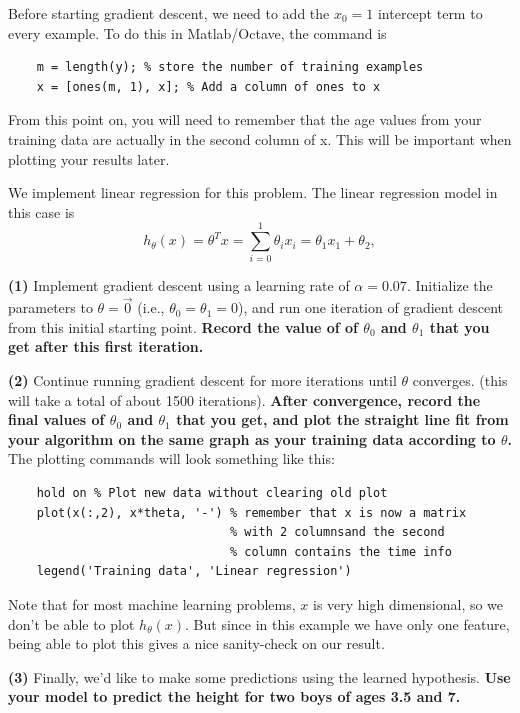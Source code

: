 \documentclass[10pt,a4paper]{article}
\begin{document}
  Before starting gradient descent, we need to add the $x_0 = 1$ intercept term to every example. To do this in Matlab/Octave, the command is
  \begin{lstlisting}
    m = length(y); % store the number of training examples
    x = [ones(m, 1), x]; % Add a column of ones to x
  \end{lstlisting}
  From this point on, you will need to remember that the age values from your training data are actually in the second column of x. This will be important when plotting your results later.


  We implement linear regression for this problem. The linear regression model in this case is
  \begin{equation}
    h_{\theta}(x) = \theta^T x = \sum_{i=0}^1 \theta_i x_i = \theta_1 x_1 + \theta_2,
  \end{equation}

  \noindent\textbf{(1)} Implement gradient descent using a learning rate of $\alpha = 0.07$. Initialize the parameters to  $\theta = \vec{0}$ (i.e.,  $\theta_0=\theta_1=0$), and run one iteration of gradient descent from this initial starting point. \textbf{Record the value of of $\theta_0$ and $\theta_1$ that you get after this first iteration.} 


  \vspace{2ex}
  \noindent\textbf{(2)} Continue running gradient descent for more iterations until $\theta$ converges. (this will take a total of about 1500 iterations). \textbf{After convergence, record the final values of $\theta_0$ and $\theta_1$ that you get, and plot the straight line fit from your algorithm on the same graph as your training data according to $\theta$.} The plotting commands will look something like this:
  \begin{lstlisting}
    hold on % Plot new data without clearing old plot
    plot(x(:,2), x*theta, '-') % remember that x is now a matrix
                               % with 2 columnsand the second 
                               % column contains the time info
    legend('Training data', 'Linear regression')

  \end{lstlisting}
  Note that for most machine learning problems, $x$ is very high dimensional, so we don't be able to plot $h_\theta(x)$. But since in this example we have only one feature, being able to plot this gives a nice sanity-check on our result.

  \vspace{2ex}
  \noindent\textbf{(3)} Finally, we'd like to make some predictions using the learned hypothesis. \textbf{Use your model to predict the height for two boys of ages 3.5 and 7.}
\end{document}
